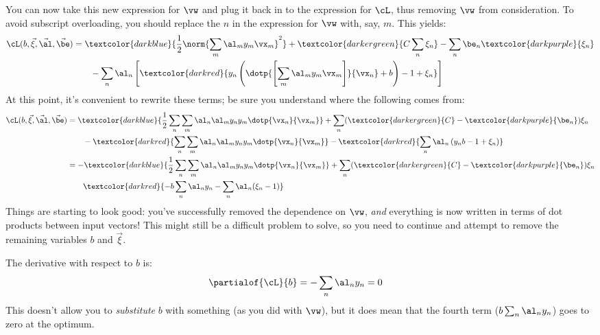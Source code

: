 You can now take this new expression for $\vw$ and plug it back in to
the expression for $\cL$, thus removing $\vw$ from consideration.  To
avoid subscript overloading, you should replace the $n$ in the
expression for $\vw$ with, say, $m$.  This yields:
%
\begin{align}
\cL(b,\vec\xi,\vec\al,\vec\be)
&=
  \textcolor{darkblue}{\frac 1 2 \norm{\sum_m \al_m y_m \vx_m}^2}
+ \textcolor{darkergreen}{C \sum_n \xi_n}
- \sum_n \be_n \textcolor{darkpurple}{\xi_n}
\\&\qquad
- \sum_n \al_n \left[
    \textcolor{darkred}{y_n \left( \dotp{\left[ \sum_m \al_m y_m \vx_m\right]}{\vx_n} + b \right) - 1 + \xi_n}
  \right]
\end{align}
%
At this point, it's convenient to rewrite these terms; be sure you
understand where the following comes from:
%
\begin{align}
\cL(b,\vec\xi,\vec\al,\vec\be)
&=
  \textcolor{darkblue}{\frac 1 2
    \sum_n \sum_m \al_n \al_m y_n y_m \dotp{\vx_n}{\vx_m}
  }
+ \sum_n (\textcolor{darkergreen}{C} - \textcolor{darkpurple}{\be_n}) \xi_n
\\&\qquad
   - \textcolor{darkred}{
    \sum_n
    \sum_m
      \al_n \al_m y_n y_m \dotp{\vx_n}{\vx_m}
}
- \textcolor{darkred}{
  \sum_n \al_n \left( y_n b - 1 + \xi_n \right)}\\
&=
-   \textcolor{darkblue}{\frac 1 2
    \sum_n \sum_m \al_n \al_m y_n y_m \dotp{\vx_n}{\vx_m}
  }
+ \sum_n (\textcolor{darkergreen}{C} - \textcolor{darkpurple}{\be_n}) \xi_n
\\&\qquad
\textcolor{darkred}{
-  b \sum_n \al_n y_n
-  \sum_n \al_n (\xi_n - 1)}
\end{align}
%
Things are starting to look good: you've successfully removed the
dependence on $\vw$, \emph{and} everything is now written in terms of
dot products between input vectors!  This might still be a difficult
problem to solve, so you need to continue and attempt to remove the
remaining variables $b$ and $\vec \xi$.

The derivative with respect to $b$ is:
%
\begin{align}
\partialof{\cL}{b}
&= - \sum_n \al_n y_n = 0
\end{align}
%
This doesn't allow you to \emph{substitute} $b$ with something (as you
did with $\vw$), but it does mean that the fourth term ($b \sum_n
\al_n y_n$) goes to zero at the optimum.

